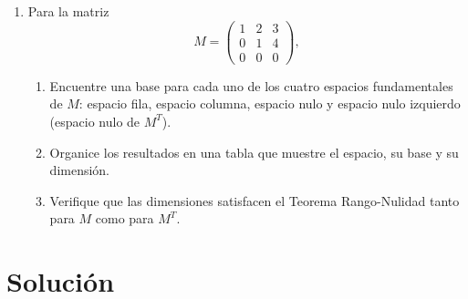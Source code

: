 \documentclass[12pt,letterpaper]{article}
\begin{document}
\begin{enumerate}
    \begin{enumerate}
        \item $\mathbf{b} = (1,\, 2,\, 3)^T$
        \item $\mathbf{b} = (5,\, 8,\, 2)^T$
        \item $\mathbf{b} = (0,\, 0,\, 0)^T$
    \end{enumerate}


    \item Para la matriz
    \[
    M = \begin{pmatrix} 1 & 2 & 3 \\ 0 & 1 & 4 \\ 0 & 0 & 0 \end{pmatrix},
    \]
    \begin{enumerate}
        \item Encuentre una base para cada uno de los cuatro espacios fundamentales de $M$: espacio fila, espacio columna, espacio nulo y espacio nulo izquierdo (espacio nulo de $M^T$).
        \item Organice los resultados en una tabla que muestre el espacio, su base y su dimensión.
        \item Verifique que las dimensiones satisfacen el Teorema Rango-Nulidad tanto para $M$ como para $M^T$.
    \end{enumerate}

\end{enumerate}

\newpage

\section*{Solución}
\end{document}
